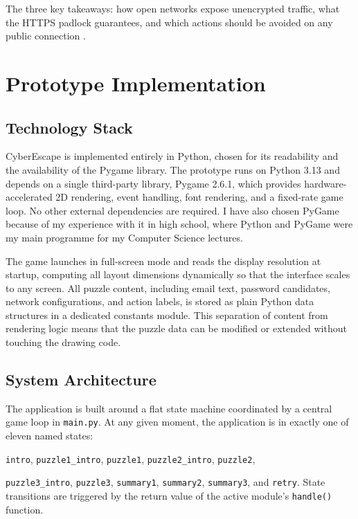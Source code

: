 \documentclass[sigconf, authorversion=true, nonacm=true]{acmart}%
\begin{document}
The three key takeaways: how open networks expose unencrypted traffic, what the HTTPS padlock guarantees, and which actions should be avoided on any public connection \cite{noauthor_threat_2025}.


\section{Prototype Implementation}

\subsection{Technology Stack}

CyberEscape is implemented entirely in Python, chosen for its readability and the availability of the Pygame library. The prototype runs on Python 3.13 and depends on a single third-party library, Pygame 2.6.1, which provides hardware-accelerated 2D rendering, event handling, font rendering, and a fixed-rate game loop. No other external dependencies are required. I have also chosen PyGame because of my experience with it in high school, where Python and PyGame were my main programme for my Computer Science lectures. 

The game launches in full-screen mode and reads the display resolution at startup, computing all layout dimensions dynamically so that the interface scales to any screen. All puzzle content, including email text, password candidates, network configurations, and action labels, is stored as plain Python data structures in a dedicated constants module. This separation of content from rendering logic means that the puzzle data can be modified or extended without touching the drawing code.

\subsection{System Architecture}

The application is built around a flat state machine coordinated by a central game loop in \texttt{main.py}. At any given moment, the application is in exactly one of eleven named states: 

\texttt{intro}, \texttt{puzzle1\_intro}, \texttt{puzzle1}, \texttt{puzzle2\_intro}, \texttt{puzzle2}, 

\texttt{puzzle3\_intro}, \texttt{puzzle3}, \texttt{summary1}, \texttt{summary2}, \texttt{summary3}, and \texttt{retry}. State transitions are triggered by the return value of the active module's \texttt{handle()} function.
\end{document}
